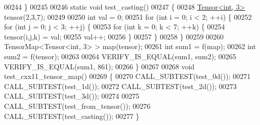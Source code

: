 \begin{DoxyCode}
00244 \}
00245 
00246 \textcolor{keyword}{static} \textcolor{keywordtype}{void} test\_casting()
00247 \{
00248   \hyperlink{class_eigen_1_1_tensor}{Tensor<int, 3>} tensor(2,3,7);
00249 
00250   \textcolor{keywordtype}{int} val = 0;
00251   \textcolor{keywordflow}{for} (\textcolor{keywordtype}{int} i = 0; i < 2; ++i) \{
00252     \textcolor{keywordflow}{for} (\textcolor{keywordtype}{int} j = 0; j < 3; ++j) \{
00253       \textcolor{keywordflow}{for} (\textcolor{keywordtype}{int} k = 0; k < 7; ++k) \{
00254         tensor(i,j,k) = val;
00255         val++;
00256       \}
00257     \}
00258   \}
00259 
00260   TensorMap<Tensor<int, 3> > map(tensor);
00261   \textcolor{keywordtype}{int} sum1 = f(map);
00262   \textcolor{keywordtype}{int} sum2 = f(tensor);
00263 
00264   VERIFY\_IS\_EQUAL(sum1, sum2);
00265   VERIFY\_IS\_EQUAL(sum1, 861);
00266 \}
00267 
00268 \textcolor{keywordtype}{void} test\_cxx11\_tensor\_map()
00269 \{
00270   CALL\_SUBTEST(test\_0d());
00271   CALL\_SUBTEST(test\_1d());
00272   CALL\_SUBTEST(test\_2d());
00273   CALL\_SUBTEST(test\_3d());
00274 
00275   CALL\_SUBTEST(test\_from\_tensor());
00276   CALL\_SUBTEST(test\_casting());
00277 \}
\end{DoxyCode}
